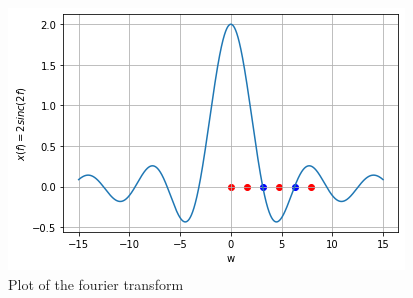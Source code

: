 \begin{figure}[!h]
 \centering
 \includegraphics[width=\columnwidth]{solutions/ec/2008/32/figs/sinc.png}
 \caption{Plot of the fourier transform}
 \label{ec/2008/32/plot2}
\end{figure}

